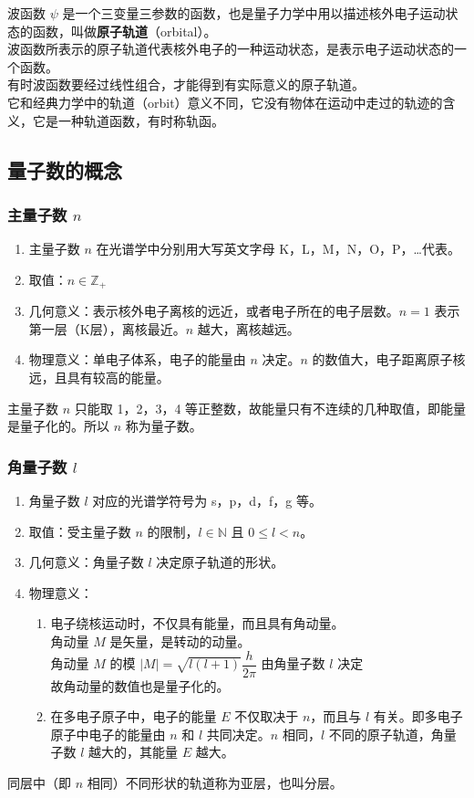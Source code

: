 波函数 $\psi$ 是一个三变量三参数的函数，也是量子力学中用以描述核外电子运动状态的函数，叫做\textbf{原子轨道}（orbital）。\\
波函数所表示的原子轨道代表核外电子的一种运动状态，是表示电子运动状态的一个函数。\\
有时波函数要经过线性组合，才能得到有实际意义的原子轨道。\\
它和经典力学中的轨道（orbit）意义不同，它没有物体在运动中走过的轨迹的含义，它是一种轨道函数，有时称轨函。

\subsection{量子数的概念}

\subsubsection{主量子数 $n$}
\begin{enumerate}
    \item 主量子数 $n$ 在光谱学中分别用大写英文字母 K，L，M，N，O，P，…代表。
    \item 取值：$n \in \mathbb{Z}_+$
    \item 几何意义：表示核外电子离核的远近，或者电子所在的电子层数。$n=1$ 表示第一层（K层），离核最近。$n$ 越大，离核越远。
    \item 物理意义：单电子体系，电子的能量由 $n$ 决定。$n$ 的数值大，电子距离原子核远，且具有较高的能量。
\end{enumerate}
主量子数 $n$ 只能取 1，2，3，4 等正整数，故能量只有不连续的几种取值，即能量是量子化的。所以 $n$ 称为量子数。

\subsubsection{角量子数 $l$}
\begin{enumerate}
    \item 角量子数 $l$ 对应的光谱学符号为 s，p，d，f，g 等。
    \item 取值：受主量子数 $n$ 的限制，$l \in \mathbb{N}$ 且 $0 \leqslant l < n$。
    \item 几何意义：角量子数 $l$ 决定原子轨道的形状。
    \item 物理意义：
    \begin{enumerate}
        \item 电子绕核运动时，不仅具有能量，而且具有角动量。\\
        角动量 $M$ 是矢量，是转动的动量。\\
        角动量 $M$ 的模 $\left| M \right| = \sqrt{l(l+1)}\dfrac{h}{2\pi}$ 由角量子数 $l$ 决定\\
        故角动量的数值也是量子化的。
        \item 在多电子原子中，电子的能量 $E$ 不仅取决于 $n$，而且与 $l$ 有关。即多电子原子中电子的能量由 $n$ 和 $l$ 共同决定。$n$ 相同，$l$ 不同的原子轨道，角量子数 $l$ 越大的，其能量 $E$ 越大。
    \end{enumerate}
\end{enumerate}
同层中（即 $n$ 相同）不同形状的轨道称为亚层，也叫分层。

